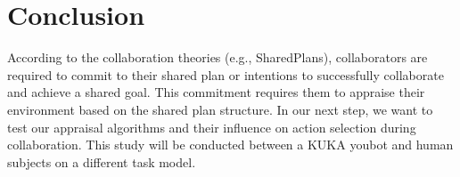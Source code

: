 \documentclass{aamas2016_extendedabstract}
\begin{document}
\vspace{-3mm}
\section{Conclusion}
According to the collaboration theories (e.g., SharedPlans), collaborators are
required to commit to their shared plan or intentions to successfully
collaborate and achieve a shared goal. This commitment requires them to appraise
their environment based on the shared plan structure. In our next step, we want
to test our appraisal algorithms and their influence on action selection during
collaboration. This study will be conducted between a KUKA youbot and human
subjects on a different task model.

% 

\vspace{-3mm}


\end{document}
